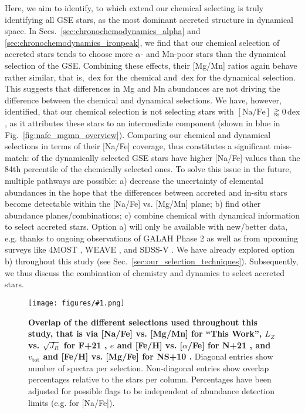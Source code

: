 \documentclass[fleqn,usenatbib]{mnras}
\newcommand{\dex}{\,\mathrm{dex}}	%
\newcommand{\codeicon}{{\faCloudDownload}}
\newcommand{\codelink}[1]{\href{https://github.com/svenbuder/buder_galah_accreted_chemistry/tree/main/figures/#1.ipynb}{\codeicon}\,\,}
\newcommand{\oscaption}[2]{\caption{#2 \codelink{#1}}}
\newcommand{\figurecolumnwidth}[3]{\begin{figure} \centering \texttt{[image: figures/\#1.png]}\oscaption{#2}{#3}\label{fig:#1} \end{figure}}
\begin{document}
Here, we aim to identify, to which extend our chemical selecting is truly identifying all GSE stars, as the most dominant accreted structure in dynamical space. In Secs.~\ref{sec:chronochemodynamics_alpha} and \ref{sec:chronochemodynamics_ironpeak}, we find that our chemical selection of accreted stars tends to choose more $\alpha$- and Mn-poor stars than the dynamical selection of the GSE. Combining these effects, their [Mg/Mn] ratios again behave rather similar, that is, $\dex$ for the chemical and $\dex$ for the dynamical selection. This suggests that differences in Mg and Mn abundances are not driving the difference between the chemical and dynamical selections. We have, however, identified, that our chemical selection is not selecting stars with $\mathrm{[Na/Fe]} \gtrapprox  0\dex$, as it attributes these stars to an intermediate component (shown in blue in Fig.~\ref{fig:nafe_mgmn_overview}). Comparing our chemical and dynamical selections in terms of their [Na/Fe] coverage, thus constitutes a significant miss-match:  of the dynamically selected GSE stars have higher [Na/Fe] values than the 84th percentile of the chemically selected ones. To solve this issue in the future, multiple pathways are possible: a) decrease the uncertainty of elemental abundances in the hope that the differences between accreted and in-situ stars become detectable within the [Na/Fe] vs. [Mg/Mn] plane; b) find other abundance planes/combinations; c) combine chemical with dynamical information to select accreted stars. Option a) will only be available with new/better data, e.g. thanks to ongoing observations of GALAH Phase 2 as well as from upcoming surveys like 4MOST \citep{deJong2019}, WEAVE \citep{WEAVE2018}, and SDSS-V \citep{Kollmeier2017}. We have already explored option b) throughout this study (see Sec.~\ref{sec:our_selection_techniques}). Subsequently, we thus discuss the combination of chemistry and dynamics to select accreted stars.

\figurecolumnwidth{selection_overlap}{chronochemodynamic_comparison}{
\textbf{Overlap of the different selections used throughout this study, that is via [Na/Fe] vs. [Mg/Mn] for ``This Work'', $L_Z$ vs. $\sqrt{J_R}$ for F+21 \citep{Feuillet2021}, $e$ and [Fe/H] vs. [$\alpha$/Fe] for N+21 \citep{Naidu2020}, and $v_\text{tot}$ and [Fe/H] vs. [Mg/Fe] for NS+10 \citep{Nissen2010}.} Diagonal entries show number of spectra per selection. Non-diagonal entries show overlap percentages relative to the stars per column. Percentages have been adjusted for possible flags to be independent of abundance detection limits (e.g. for [Na/Fe]). 
}
\end{document}
